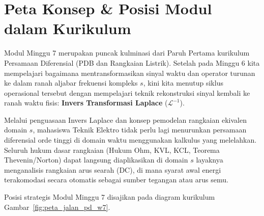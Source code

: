 \documentclass[11pt,a4paper]{article}
\theoremstyle{definition}
\begin{document}
\vspace{0.3cm}
\tableofcontents
\vspace{0.5cm}

\newpage

\section{Peta Konsep \& Posisi Modul dalam Kurikulum}

Modul Minggu 7 merupakan puncak kulminasi dari Paruh Pertama kurikulum Persamaan Diferensial (PDB dan Rangkaian Listrik). Setelah pada Minggu 6 kita mempelajari bagaimana mentransformasikan sinyal waktu dan operator turunan ke dalam ranah aljabar frekuensi kompleks $s$, kini kita menutup siklus operasional tersebut dengan mempelajari teknik rekonstruksi sinyal kembali ke ranah waktu fisis: \textbf{Invers Transformasi Laplace} ($\mathcal{L}^{-1}$).

Melalui penguasaan Invers Laplace dan konsep pemodelan rangkaian ekivalen domain $s$, mahasiswa Teknik Elektro tidak perlu lagi menurunkan persamaan diferensial orde tinggi di domain waktu menggunakan kalkulus yang melelahkan. Seluruh hukum dasar rangkaian (Hukum Ohm, KVL, KCL, Teorema Thevenin/Norton) dapat langsung diaplikasikan di domain $s$ layaknya menganalisis rangkaian arus searah (DC), di mana syarat awal energi terakomodasi secara otomatis sebagai sumber tegangan atau arus semu.

Posisi strategis Modul Minggu 7 disajikan pada diagram kurikulum Gambar~\ref{fig:peta_jalan_pd_w7}.
\end{document}
